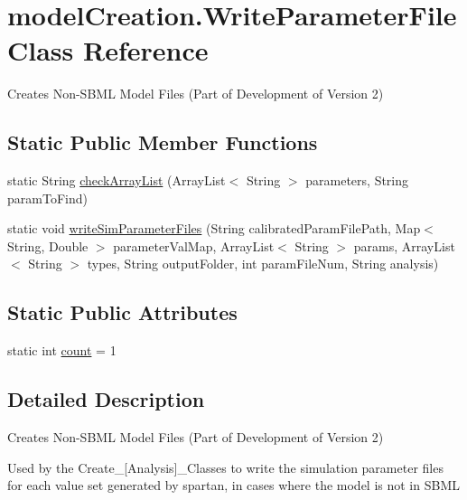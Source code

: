 \hypertarget{classmodelCreation_1_1WriteParameterFile}{}\section{model\+Creation.\+Write\+Parameter\+File Class Reference}
\label{classmodelCreation_1_1WriteParameterFile}


Creates Non-\/\+S\+B\+M\+L Model Files (Part of Development of Version 2)  


\subsection*{Static Public Member Functions}
\begin{DoxyCompactItemize}
\item 
static String \hyperlink{classmodelCreation_1_1WriteParameterFile_a9736c6abf22b0181e1dc413c29126edb}{check\+Array\+List} (Array\+List$<$ String $>$ parameters, String param\+To\+Find)
\item 
static void \hyperlink{classmodelCreation_1_1WriteParameterFile_a283308d9886e79974784a83b1f04a656}{write\+Sim\+Parameter\+Files} (String calibrated\+Param\+File\+Path, Map$<$ String, Double $>$ parameter\+Val\+Map, Array\+List$<$ String $>$ params, Array\+List$<$ String $>$ types, String output\+Folder, int param\+File\+Num, String analysis)
\end{DoxyCompactItemize}
\subsection*{Static Public Attributes}
\begin{DoxyCompactItemize}
\item 
static int \hyperlink{classmodelCreation_1_1WriteParameterFile_ac295de06582595b7730fef191ec801b9}{count} = 1
\end{DoxyCompactItemize}


\subsection{Detailed Description}
Creates Non-\/\+S\+B\+M\+L Model Files (Part of Development of Version 2) 

Used by the Create\+\_\+\mbox{[}Analysis\mbox{]}\+\_\+\+Classes to write the simulation parameter files for each value set generated by spartan, in cases where the model is not in S\+B\+M\+L


